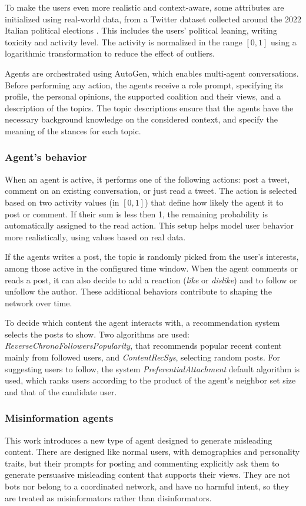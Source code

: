 To make the users even more realistic and context-aware, some attributes are initialized using real-world data, from a Twitter dataset collected around the 2022 Italian political elections \cite{pierri2023ita}.
This includes the users' political leaning, writing toxicity and activity level.
The activity is normalized in the range $[0,1]$ using a logarithmic transformation to reduce the effect of outliers.

Agents are orchestrated using AutoGen, which enables multi-agent conversations.
Before performing any action, the agents receive a role prompt, specifying its profile, the personal opinions, the supported coalition and their views, and a description of the topics.
The topic descriptions ensure that the agents have the necessary background knowledge on the considered context, and specify the meaning of the stances for each topic.


\subsubsection{Agent's behavior}
When an agent is active, it performs one of the following actions: post a tweet, comment on an existing conversation, or just read a tweet.
The action is selected based on two activity values (in $[0,1]$) that define how likely the agent it to post or comment.
If their sum is less then 1, the remaining probability is automatically assigned to the read action.
This setup helps model user behavior more realistically, using values based on real data.

If the agents writes a post, the topic is randomly picked from the user's interests, among those active in the configured time window.
When the agent comments or reads a post, it can also decide to add a reaction (\textit{like} or \textit{dislike}) and to follow or unfollow the author.
These additional behaviors contribute to shaping the network over time.

To decide which content the agent interacts with, a recommendation system selects the posts to show. Two algorithms are used: \textit{ReverseChronoFollowersPopularity}, that recommends popular recent content mainly from followed users, and \textit{ContentRecSys}, selecting random posts.
For suggesting users to follow, the system \textit{PreferentialAttachment} default algorithm is used, which ranks users according to the product of the agent’s neighbor set size and that of the candidate user.


\subsubsection{Misinformation agents}
This work introduces a new type of agent designed to generate misleading content.
There are designed like normal users, with demographics and personality traits, but their prompts for posting and commenting explicitly ask them to generate persuasive misleading content that supports their views.
They are not bots nor belong to a coordinated network, and have no harmful intent, so they are treated as misinformators rather than disinformators.

